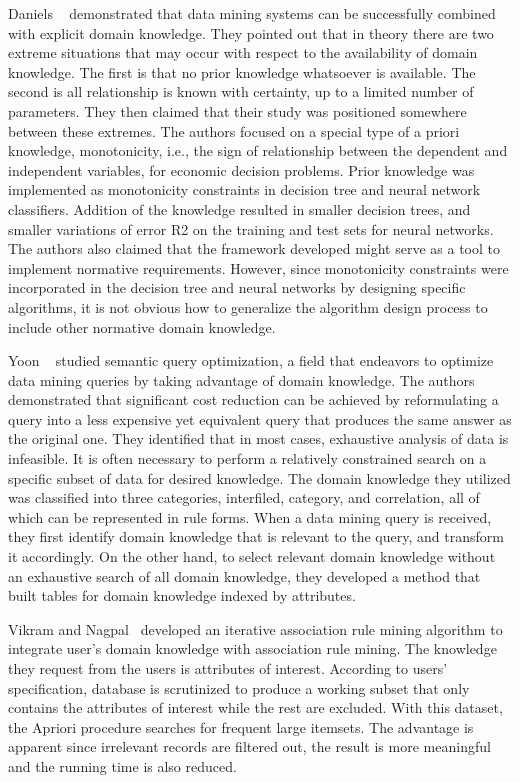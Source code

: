Daniels \etal~\cite{Daniels01} demonstrated that data mining systems can be successfully combined with explicit domain knowledge. They pointed out that in theory there are two extreme situations that may occur with respect to the availability of domain knowledge. The first is that no prior knowledge whatsoever is available. The second is all relationship is known with certainty, up to a limited number of parameters. They then claimed that their study was positioned somewhere between these extremes. The authors focused on a special type of a priori knowledge, monotonicity, i.e., the sign of relationship between the dependent and independent variables, for economic decision problems. Prior knowledge was implemented as monotonicity constraints in decision tree and neural network classifiers. Addition of the knowledge resulted in smaller decision trees, and smaller variations of error R2 on the training and test sets for neural networks. The authors also claimed that the framework developed might serve as a tool to implement normative requirements. However, since monotonicity constraints were incorporated in the decision tree and neural networks by designing specific algorithms, it is not obvious how to generalize the algorithm design process to include other normative domain knowledge.

Yoon \etal~\cite{Yoon1999} studied semantic query optimization, a field that endeavors to optimize data mining queries by taking advantage of domain knowledge. The authors demonstrated that significant cost reduction can be achieved by reformulating a query into a less expensive yet equivalent query that produces the same answer as the original one. They identified that in most cases, exhaustive analysis of data is infeasible. It is often necessary to perform a relatively constrained search on a specific subset of data for desired knowledge. The domain knowledge they utilized was classified into three categories, interfiled, category, and correlation, all of which can be represented in rule forms. When a data mining query is received, they first identify domain knowledge that is relevant to the query, and transform it accordingly. On the other hand, to select relevant domain knowledge without an exhaustive search of all domain knowledge, they developed a method that built tables for domain knowledge indexed by attributes.

Vikram and Nagpal~\cite{Vikram2010} developed an iterative association rule mining algorithm to integrate user's domain knowledge with association rule mining. The knowledge they request from the users is attributes of interest. According to users' specification, database is scrutinized to produce a working subset that only contains the attributes of interest while the rest are excluded. With this dataset, the Apriori procedure searches for frequent large itemsets. The advantage is apparent since irrelevant records are filtered out, the result is more meaningful and the running time is also reduced.


